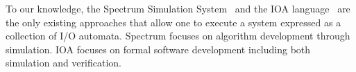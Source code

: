 

To our knowledge, the Spectrum Simulation System~\cite{goldman1990distributed} and the IOA language~\cite{garland2003ioa} are the only existing approaches that allow one to execute a system expressed as a collection of I/O automata.
Spectrum focuses on algorithm development through simulation.
IOA focuses on formal software development including both simulation and verification.

